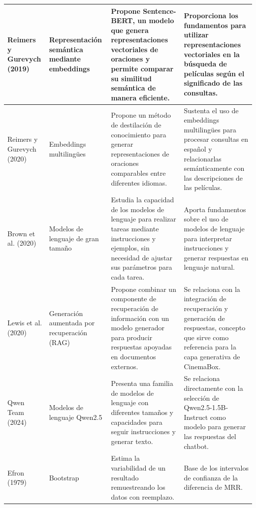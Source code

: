 \begin{landscape}
\begin{table}[H]
\begin{tabularx}{\columnwidth}{|p{2.6cm}|p{2.8cm}|X|X|}
        Reimers y Gurevych (2019) \cite{reimers2019sbert} &
        Representación semántica mediante embeddings &
        Propone Sentence-BERT, un modelo que genera representaciones vectoriales de oraciones y permite comparar su similitud semántica de manera eficiente. &
        Proporciona los fundamentos para utilizar representaciones vectoriales en la búsqueda de películas según el significado de las consultas. \\
        \hline

        Reimers y Gurevych (2020) \cite{reimers2020multilingual} &
        Embeddings multilingües &
        Propone un método de destilación de conocimiento para generar representaciones de oraciones comparables entre diferentes idiomas. &
        Sustenta el uso de embeddings multilingües para procesar consultas en español y relacionarlas semánticamente con las descripciones de las películas. \\
        \hline

        Brown et al. (2020) \cite{brown2020} &
        Modelos de lenguaje de gran tamaño &
        Estudia la capacidad de los modelos de lenguaje para realizar tareas mediante instrucciones y ejemplos, sin necesidad de ajustar sus parámetros para cada tarea. &
        Aporta fundamentos sobre el uso de modelos de lenguaje para interpretar instrucciones y generar respuestas en lenguaje natural. \\
        \hline

        Lewis et al. (2020) \cite{lewis2020} &
        Generación aumentada por recuperación (RAG) &
        Propone combinar un componente de recuperación de información con un modelo generador para producir respuestas apoyadas en documentos externos. &
        Se relaciona con la integración de recuperación y generación de respuestas, concepto que sirve como referencia para la capa generativa de CinemaBox. \\
        \hline

        Qwen Team (2024) \cite{qwen2024} &
        Modelos de lenguaje Qwen2.5 &
        Presenta una familia de modelos de lenguaje con diferentes tamaños y capacidades para seguir instrucciones y generar texto. &
        Se relaciona directamente con la selección de Qwen2.5-1.5B-Instruct como modelo para generar las respuestas del chatbot. \\
        \hline

        Efron (1979) \cite{efron1979bootstrap} &
        Bootstrap &
        Estima la variabilidad de un resultado remuestreando los datos con reemplazo. &
        Base de los intervalos de confianza de la diferencia de MRR. \\
        \hline


\end{tabularx}
\end{table}
\end{landscape}
